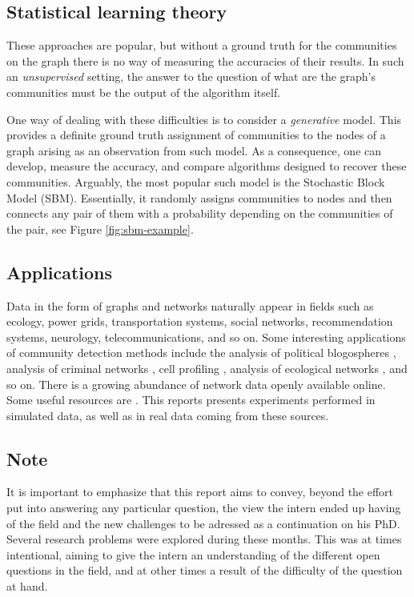 \documentclass[../../main.tex]{subfiles} %
\begin{document}
\subsection{Statistical learning theory}
These approaches are popular, but without a ground truth for the 
communities 
on the graph there is no way of measuring the accuracies of their results. In 
such an \textit{unsupervised} setting, the answer to the question of what 
are 
the graph's communities must be the output of the algorithm itself. 

One way of dealing with these difficulties is to consider a \textit{generative} 
model. This provides a definite ground truth assignment of communities to the 
nodes of a graph arising as an observation from such model. As a consequence, 
one can develop, measure the accuracy, and compare algorithms designed to 
recover these communities. Arguably, the most popular such model is the 
Stochastic Block Model (SBM). Essentially, it randomly assigns communities to 
nodes and then connects any pair of them with a probability depending on the 
communities of the pair, see Figure \ref{fig:sbm-example}.

\subsection{Applications}
Data in the form of graphs and networks naturally appear in fields such as 
ecology, power grids, transportation systems, social networks, recommendation 
systems, neurology, telecommunications, and so on. Some interesting 
applications of community detection methods include the analysis of political 
blogospheres \cite{latouche_overlapping_2011}, 
analysis of criminal networks \cite{legramanti_extended_2022}, cell profiling 
\cite{morelli_nested_2021}, analysis of ecological networks 
\cite{miele_revealing_2017}, and so on. There is a growing abundance of 
network data openly available online. Some useful resources are 
\cite{newman-resources, pozo-resources, peixoto-resources, 
stanford-resources}. This reports presents experiments performed in simulated 
data, as well as in real data coming from these sources.

\subsection{Note}
It is important to emphasize that this report aims to convey, beyond the effort 
put into answering any particular question, the view the intern ended up having 
of the field and the new challenges to be adressed as a continuation on his 
PhD. Several research problems were explored during these months. This was at 
times intentional, aiming to give the intern an understanding of the different 
open questions in the field, and at other times a result of the difficulty of 
the question at hand.
\end{document}
